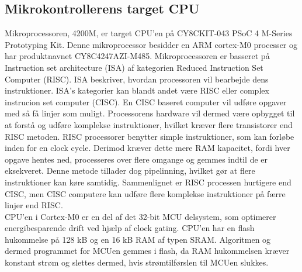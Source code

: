 \subsection{Mikrokontrollerens target CPU}
Mikroprocessoren, 4200M, er target CPU'en på CY8CKIT-043 PSoC 4 M-Series Prototyping Kit. Denne mikroprocessor besidder en ARM cortex-M0 processer og har produktnavnet CY8C4247AZI-M485. Mikroprocessoren er basseret på Instruction set architecture (ISA) af kategorien Reduced Instruction Set Computer (RISC). ISA beskriver, hvordan processoren vil bearbejde dens instruktioner. ISA's kategorier kan blandt andet være RISC eller complex instrucion set computer (CISC). En CISC baseret computer vil udføre opgaver med så få linjer som muligt. Processorens hardware vil dermed være opbygget til at forstå og udføre komplekse instruktioner, hvilket kræver flere transistorer end RISC metoden. RISC processorer benytter simple instruktioner, som kan forløbe inden for en clock cycle. Derimod kræver dette mere RAM kapacitet, fordi hver opgave hentes ned, processeres over flere omgange og gemmes indtil de er eksekveret. Denne metode tillader dog pipelinning, hvilket gør at flere instruktioner kan køre samtidig. Sammenlignet er RISC processen hurtigere end CISC, men CISC computere kan udføre flere komplekse instruktioner på færre linjer end RISC. \citep{CYPRESS2016Cortexm0,Semiconductor20164200M,Yadav2016}\\
CPU'en i Cortex-M0 er en del af det 32-bit MCU delsystem, som optimerer energibesparende drift ved hjælp af clock gating. %
CPU'en har en flash hukommelse på 128 kB og en 16 kB RAM af typen SRAM. Algoritmen og dermed programmet for MCUen gemmes i flash, da RAM hukommelsen kræver konstant strøm og slettes dermed, hvis strømtilførslen til MCUen slukkes. \citep{Semiconductor20164200M}
%
